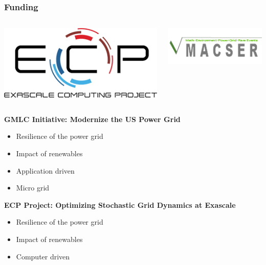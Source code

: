 \begin{frame}
  \frametitle{Funding}
  \begin{columns}
  \begin{column}{0.45\textwidth}
    \begin{center}
      \includegraphics[width=.75\textwidth]{./figures/ecp} \\
    \end{center}
  \end{column}
  \begin{column}{0.45\textwidth}
    \begin{center}
      \includegraphics[width=.75\textwidth]{./figures/macser}
    \end{center}
  \end{column}
  \end{columns}
  \vspace{0.25cm}
  {\bf GMLC Initiative: Modernize the US Power Grid}
  \begin{itemize}
    \item Resilience of the power grid 
    \item Impact of renewables
    \item Application driven
    \item Micro grid
  \end{itemize}
  {\bf ECP Project: Optimizing Stochastic Grid Dynamics at Exascale} 
  \begin{itemize}
    \item Resilience of the power grid 
    \item Impact of renewables
    \item Computer driven
  \end{itemize}
\end{frame}

